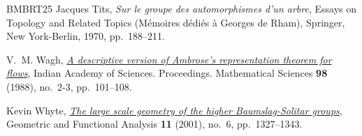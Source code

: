 \documentclass[reqno]{amsart}
\begin{document}
\begin{thebibliography}{BMBRT25}
Jacques Tits, \emph{Sur le groupe des automorphismes d'un arbre}, Essays on {T}opology and {R}elated {T}opics ({M}\'{e}moires d\'{e}di\'{e}s \`a {G}eorges de {R}ham), Springer, New York-Berlin, 1970, pp.~188--211.

V.~M. Wagh, \href{https://doi.org/10.1007/BF02863630}{\emph{A descriptive version of {A}mbrose's representation theorem for flows}}, Indian Academy of Sciences. Proceedings. Mathematical Sciences \textbf{98} (1988), no.~2-3, pp.~101--108.

Kevin Whyte, \href{https://doi.org/10.1007/s00039-001-8232-6}{\emph{The large scale geometry of the higher {B}aumslag-{S}olitar groups}}, Geometric and Functional Analysis \textbf{11} (2001), no.~6, pp.~1327--1343.

\end{thebibliography}

%

\end{document}
